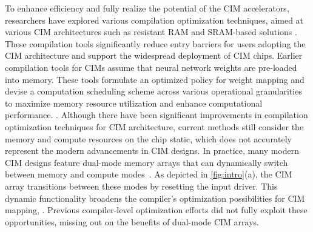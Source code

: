 To enhance efficiency and fully realize the potential of the CIM accelerators, researchers have explored various compilation optimization techniques, aimed at various CIM architectures such as resistant RAM and SRAM-based solutions \cite{qu2024cim,sun2023pimcomp,farzaneh2023c4cam,han2021polyhedral,siemieniuk2021occ,drebes2020tc}. These compilation tools significantly reduce entry barriers for users adopting the CIM architecture and support the widespread deployment of CIM chips.
Earlier compilation tools for CIMs assume that neural network weights are pre-loaded into memory. These tools formulate an optimized policy for weight mapping and devise a computation scheduling scheme across various operational granularities to maximize memory resource utilization and enhance computational performance. \cite{qu2024cim,siemieniuk2021occ,ankit2019puma}.
Although there have been significant improvements in compilation optimization techniques for CIM architecture, current methods still consider the memory and compute resources on the chip static, which does not accurately represent the modern advancements in CIM designs.
In practice, many modern CIM designs feature dual-mode memory arrays that can dynamically switch between memory and compute modes~\cite{kim202316,yan20221,guo202328nm,yue202115}. As depicted in \fig\ref{fig:intro}(a), the CIM array transitions between these modes by resetting the input driver. This dynamic functionality broadens the compiler's optimization possibilities for CIM mapping, . Previous compiler-level optimization efforts did not fully exploit these opportunities, missing out on the benefits of dual-mode CIM arrays.

